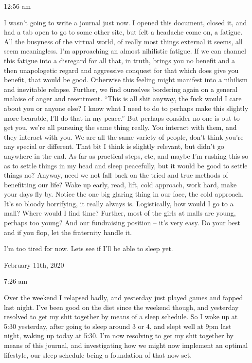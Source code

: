 12:56 am

I wasn't going to write a journal just now. I opened this document,
closed it, and had a tab open to go to some other site, but felt a
headache come on, a fatigue. All the busyness of the virtual world, of
really most things external it seems, all seem meaningless. I'm
approaching an almost nihilistic fatigue. If we can channel this fatigue
into a disregard for all that, in truth, brings you no benefit and a
then unapologetic regard and aggressive conquest for that which does
give you benefit, that would be good. Otherwise this feeling might
manifest into a nihilism and inevitable relapse. Further, we find
ourselves bordering again on a general malaise of anger and resentment.
``This is all shit anyway, the fuck would I care about you or anyone
else? I know what I need to do to perhaps make this slightly more
bearable, I'll do that in my peace.'' But perhaps consider no one is out
to get you, we're all pursuing the same thing really. You interact with
them, and they interact with you. We are all the same variety of people,
don't think you're any special or different. That bit I think is
slightly relevant, but didn't go anywhere in the end. As far as
practical steps, etc, and maybe I'm rushing this so as to settle things
in my head and sleep peacefully, but it would be good to settle things
no? Anyway, need we not fall back on the tried and true methods of
benefitting our life? Wake up early, read, lift, cold approach, work
hard, make your days fly by. Notice the one big glaring thing in our
face, the cold approach. It's so bloody horrifying, it really always is.
Logistically, how would I go to a mall? Where would I find time?
Further, most of the girls at malls are young, perhaps too young? And
our fundraising position -- it's very easy. Do your best and if you
flop, let the fraternity handle it.

I'm too tired for now. Lets see if I'll be able to sleep yet.

\bigskip
\bigskip
February 11th, 2020

7:26 am

Over the weekend I relapsed badly, and yesterday just played games and
fapped last night. I've been good on the diet since the weekend though,
and yesterday resolved to get my shit together by means of a sleep
schedule. So I woke up at 5:30 yesterday, after going to sleep around 3
or 4, and slept well at 9pm last night, waking up today at 5:30. I'm now
resolving to get my shit together by means of this journal, and
investigating how we might now implement an optimal lifestyle, our sleep
schedule being a foundation of that now set.


